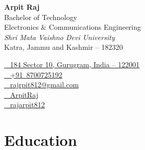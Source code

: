\documentclass[11pt,a4paper,sans]{moderncv}
\begin{document}
\begin{minipage}[t]{0.5\textwidth}
  \vspace{0pt} %
    {\Huge\sffamily\bfseries\color{color1} Arpit Raj}\\[0.5em]
    {\large\color{color2} Bachelor of Technology}\\[0.1em]
    {\normalsize Electronics \& Communications Engineering}\\[0.1em]
    {\small\textit{Shri Mata Vaishno Devi University}}\\[0.1em]
    {\small Katra, Jammu and Kashmir -- 182320}
\end{minipage}%
\hfill%
\begin{minipage}[t]{0.45\textwidth}
  \vspace{0pt} %
  \begin{flushright}
    \color{color2}\small
    \href{https://maps.google.com/?q=184+Sector+10,+Gurugram,+India}{\faMapMarker~ 184 Sector 10, Gurugram, India -- 122001} \\[0.4em]
    \href{tel:+918700725192}{\faPhone~ +91~8700725192} \\[0.4em]
    \href{mailto:rajrpit812@gmail.com}{\faEnvelope~ rajrpit812@gmail.com} \\[0.4em]
    \href{https://www.linkedin.com/in/arpit420}{\faLinkedin~ ArpitRaj} \\[0.4em]
    \href{https://github.com/rajarpit812}{\faGithub~ rajarpit812}
  \end{flushright}
\end{minipage}

\vspace{2.5em}

\section{Education}
\end{document}
